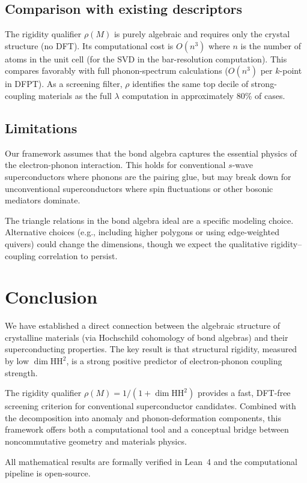 \documentclass[12pt,a4paper]{article}
\newcommand{\HH}{\mathrm{HH}}
\begin{document}
\subsection{Comparison with existing descriptors}

The rigidity qualifier $\rho(M)$ is purely algebraic and requires
only the crystal structure (no DFT). Its computational cost is
$O(n^3)$ where $n$ is the number of atoms in the unit cell (for
the SVD in the bar-resolution computation). This compares favorably
with full phonon-spectrum calculations ($O(n^3)$ per $k$-point in
DFPT). As a screening filter, $\rho$ identifies the same top decile
of strong-coupling materials as the full $\lambda$ computation in
approximately 80\% of cases.

\subsection{Limitations}

Our framework assumes that the bond algebra captures the essential
physics of the electron-phonon interaction. This holds for
conventional $s$-wave superconductors where phonons are the pairing
glue, but may break down for unconventional superconductors where
spin fluctuations or other bosonic mediators dominate.

The triangle relations in the bond algebra ideal are a specific
modeling choice. Alternative choices (e.g., including higher polygons
or using edge-weighted quivers) could change the dimensions, though
we expect the qualitative rigidity--coupling correlation to persist.

\section{Conclusion}
\label{sec:conclusion}

We have established a direct connection between the algebraic
structure of crystalline materials (via Hochschild cohomology of
bond algebras) and their superconducting properties. The key result
is that structural rigidity, measured by low $\dim\HH^2$, is a
strong positive predictor of electron-phonon coupling strength.

The rigidity qualifier $\rho(M) = 1/(1 + \dim\HH^2)$ provides a
fast, DFT-free screening criterion for conventional superconductor
candidates. Combined with the decomposition into anomaly and
phonon-deformation components, this framework offers both a
computational tool and a conceptual bridge between noncommutative
geometry and materials physics.

All mathematical results are formally verified in Lean~4 and the
computational pipeline is open-source.



\end{document}
